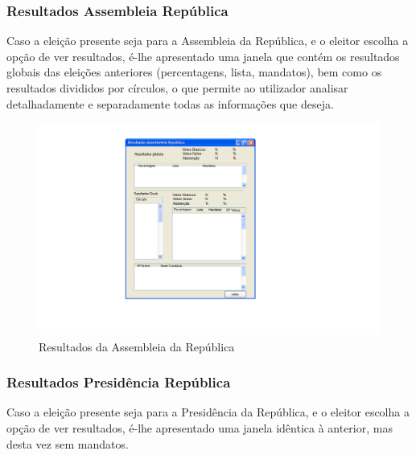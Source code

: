 \documentclass[a4paper,12pt]{report}
\begin{document}
\newpage
\subsubsection{Resultados Assembleia República}
Caso a eleição presente seja para a Assembleia da República, e o eleitor escolha a opção de ver resultados, é-lhe apresentado uma janela que contém os resultados globais das eleições anteriores (percentagens, lista, mandatos), bem como os resultados divididos por círculos, o que permite ao utilizador analisar detalhadamente e separadamente todas as informações que deseja.

\begin{figure}[h]
\begin{center}
	\includegraphics[width=1.3\textwidth]{media/mockup/ver_resultados_ar.png}
	 \caption{Resultados da Assembleia da República}
\end{center}
\end{figure}

\newpage
\subsubsection{Resultados Presidência República}
Caso a eleição presente seja para a Presidência da República, e o eleitor escolha a opção de ver resultados, é-lhe apresentado uma janela idêntica à anterior, mas desta vez sem mandatos.
\end{document}
